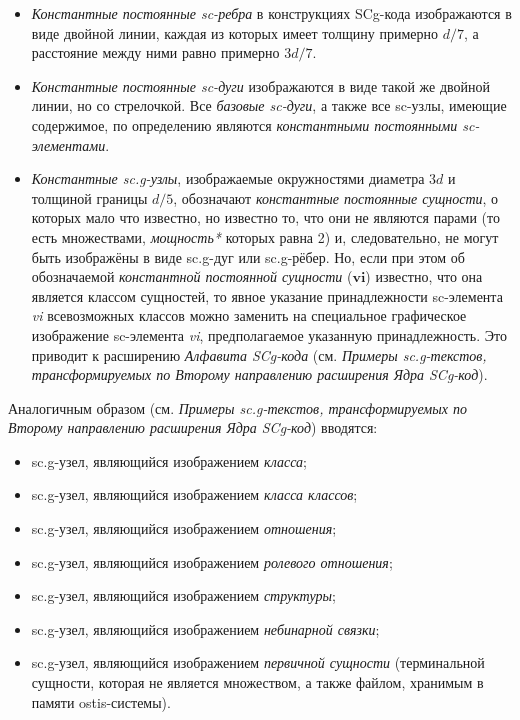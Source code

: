 \begin{itemize}
	\item \textit{Константные постоянные sc-ребра} в конструкциях SCg-кода изображаются в виде двойной линии, каждая из которых имеет толщину примерно $d/7$, а расстояние между ними равно примерно $3d/7$. 
	\item \textit{Константные постоянные sc-дуги} изображаются в виде такой же двойной линии, но со стрелочкой. Все \textit{базовые sc-дуги}, а также все sc-узлы, имеющие содержимое, по определению являются \textit{константными постоянными sc-элементами}. 
	\item \textit{Константные sc.g-узлы}, изображаемые окружностями диаметра $3d$ и толщиной границы $d/5$, обозначают \textit{константные постоянные сущности}, о которых мало что известно, но известно то, что они не являются парами (то есть множествами, \textit{мощность*} которых равна 2) и, следовательно, не могут быть изображёны в виде sc.g-дуг или sc.g-рёбер. Но, если при этом об обозначаемой \textit{константной постоянной сущности} ($\bm{vi}$) известно, что она является классом сущностей, то явное указание принадлежности sc-элемента \textit{vi} всевозможных классов можно заменить на специальное графическое изображение sc-элемента \textit{vi}, предполагаемое указанную принадлежность. Это приводит к расширению  \textit{Алфавита SCg-кода} (см. \textit{Примеры sc.g-текстов, трансформируемых по Второму направлению расширения Ядра SCg-код}).
\end{itemize}


Аналогичным образом (см. \textit{Примеры sc.g-текстов, трансформируемых по Второму направлению расширения Ядра SCg-код}) вводятся: 
\begin{itemize}
	\item sc.g-узел, являющийся изображением \textit{класса};  
	\item sc.g-узел, являющийся изображением \textit{класса классов};  
	\item sc.g-узел, являющийся изображением \textit{отношения}; 
	\item sc.g-узел, являющийся изображением \textit{ролевого отношения}; 
	\item sc.g-узел, являющийся изображением \textit{структуры};  
	\item sc.g-узел, являющийся изображением \textit{небинарной связки};
	\item sc.g-узел, являющийся изображением \textit{первичной сущности} (терминальной сущности, которая не является множеством, а также файлом, хранимым в памяти ostis-системы).
\end{itemize}

